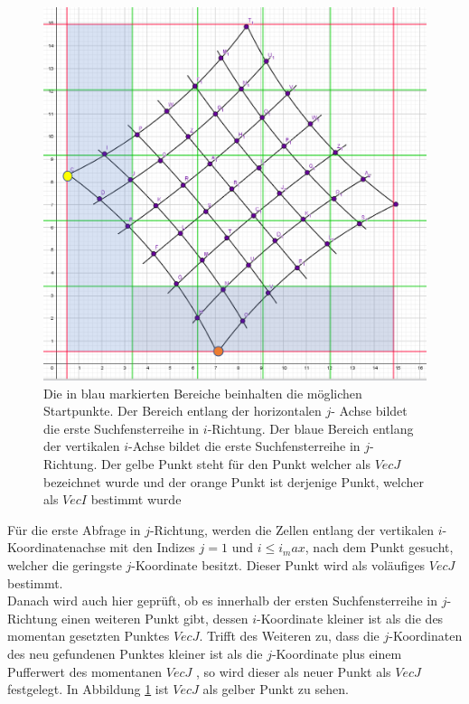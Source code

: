 \begin{figure}[!htb]
	\centering
	\includegraphics[width=0.8\linewidth]{images/VerzeichnetesSchachbrett_1.png}
	\caption[Startpunktsuche in Schachbrettpunkten]{Die in blau markierten Bereiche beinhalten die möglichen Startpunkte. Der Bereich entlang der horizontalen $j$- Achse bildet die erste Suchfensterreihe in $i$-Richtung. Der blaue Bereich entlang der vertikalen $i$-Achse bildet die erste Suchfensterreihe in $j$-Richtung. Der gelbe Punkt steht für den Punkt welcher als $VecJ$ bezeichnet wurde und der orange Punkt ist derjenige Punkt, welcher als $VecI$ bestimmt wurde}
	\label{fig:7.1}
\end{figure}


Für die erste Abfrage in $j$-Richtung, werden die Zellen entlang der vertikalen $i$-Koordinatenachse mit den Indizes $j=1$ und $i \leq i_max$, nach dem Punkt gesucht, welcher die geringste $j$-Koordinate besitzt. Dieser Punkt wird als voläufiges $VecJ$ bestimmt.\\

Danach wird auch hier geprüft, ob es innerhalb der ersten Suchfensterreihe in $j$-Richtung einen weiteren Punkt gibt, dessen $i$-Koordinate kleiner ist als die des momentan gesetzten Punktes $VecJ$. Trifft des Weiteren zu, dass die $j$-Koordinaten des neu gefundenen Punktes kleiner ist als die $j$-Koordinate plus einem Pufferwert des momentanen $VecJ$ , so wird dieser als neuer Punkt als $VecJ$ festgelegt. In Abbildung \ref{fig:7.1} ist $VecJ$ als gelber Punkt zu sehen.\\

